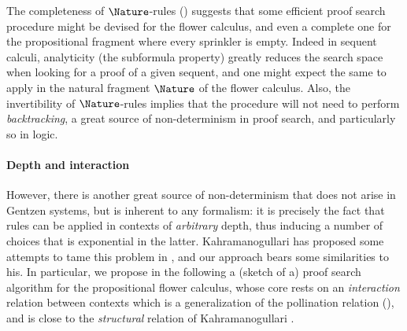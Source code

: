 The completeness of $\Nature$-rules () suggests
that some efficient proof search procedure might be devised for the flower
calculus, and even a complete one for the propositional fragment where every
sprinkler is empty. Indeed in sequent calculi, analyticity
(the subformula property) greatly reduces the search space when looking for a
proof of a given sequent, and one might expect the same to apply in the natural
fragment $\Nature$ of the flower calculus. Also, the invertibility of
$\Nature$-rules implies that the procedure will not need to perform
\emph{backtracking}, a great source of non-determinism in proof
search, and particularly so in  logic.

\paragraph{Depth and interaction}

However, there is another great source of non-determinism that does not arise in
Gentzen systems, but is inherent to any  formalism: it is
precisely the fact that rules can be applied in contexts of \emph{arbitrary}
depth, thus inducing a number of choices that is exponential in the latter.
Kahramanogullari has proposed some attempts to tame this problem in
, and our approach bears some
similarities to his. In particular, we propose in the following a (sketch of a)
proof search algorithm for the propositional flower calculus, whose core rests
on an \emph{interaction} relation between contexts which is a generalization of
the pollination relation (), and is close to the
\emph{structural} relation of Kahramanogullari
\cite[Definition~2.13]{lmcs:1089}.


